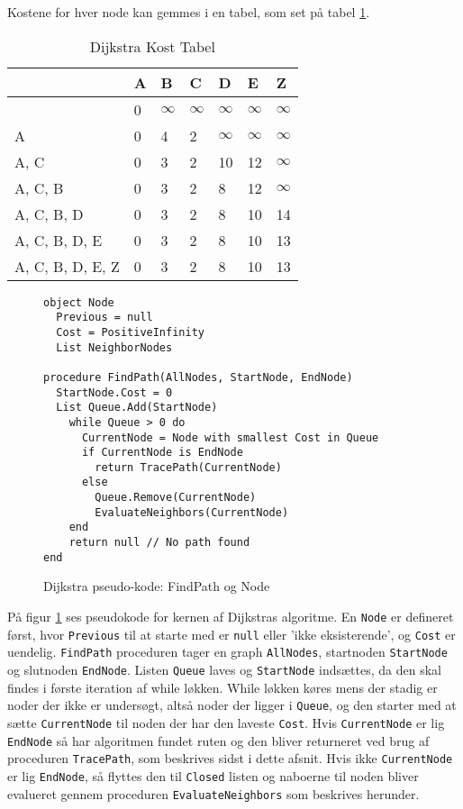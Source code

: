 Kostene for hver node kan gemmes i en tabel, som set på tabel \ref{dijktabel}.
  
\begin{table}[H]
\centering
  \begin{tabular}{|l|l|l|l|l|l|l|}
  \hline
                   & A & B & C & D  & E  & Z  \\ \hline
                   & 0 & $\infty$ & $\infty$ & $\infty$  & $\infty$  & $\infty$  \\ \hline
  A                & 0 & 4 & 2 & $\infty$  & $\infty$  & $\infty$  \\ \hline
  A, C             & 0 & 3 & 2 & 10 & 12 & $\infty$  \\ \hline
  A, C, B          & 0 & 3 & 2 & 8  & 12 & $\infty$  \\ \hline
  A, C, B, D       & 0 & 3 & 2 & 8  & 10 & 14 \\ \hline
  A, C, B, D, E    & 0 & 3 & 2 & 8  & 10 & 13 \\ \hline
  A, C, B, D, E, Z & 0 & 3 & 2 & 8  & 10 & 13 \\ \hline
  \end{tabular}
  \label{dijktabel}
  \caption{Dijkstra Kost Tabel}
\end{table}

\begin{figure}[H]
\begin{lstlisting}
object Node
  Previous = null
  Cost = PositiveInfinity
  List NeighborNodes

procedure FindPath(AllNodes, StartNode, EndNode)
  StartNode.Cost = 0
  List Queue.Add(StartNode)
    while Queue > 0 do
      CurrentNode = Node with smallest Cost in Queue
      if CurrentNode is EndNode
        return TracePath(CurrentNode)
      else
        Queue.Remove(CurrentNode)
        EvaluateNeighbors(CurrentNode)
    end
    return null // No path found
end
\end{lstlisting}
\caption{Dijkstra pseudo-kode: FindPath og Node}\label{DijkstraCodeFindPathNode}
\end{figure}

På figur \ref{DijkstraCodeFindPathNode} ses pseudokode for kernen af Dijkstras algoritme. En \texttt{Node} er defineret først, hvor \texttt{Previous} til at starte med er \texttt{null} eller 'ikke eksisterende', og \texttt{Cost} er uendelig. \texttt{FindPath} proceduren tager en graph \texttt{AllNodes}, startnoden \texttt{StartNode} og slutnoden \texttt{EndNode}. Listen \texttt{Queue} laves og \texttt{StartNode} indsættes, da den skal findes i første iteration af while løkken. While løkken køres mens der stadig er noder der ikke er undersøgt, altså noder der ligger i \texttt{Queue}, og den starter med at sætte \texttt{CurrentNode} til noden der har den laveste \texttt{Cost}. Hvis \texttt{CurrentNode} er lig \texttt{EndNode} så har algoritmen fundet ruten og den bliver returneret ved brug af proceduren \texttt{TracePath}, som beskrives sidst i dette afsnit. Hvis ikke \texttt{CurrentNode} er lig \texttt{EndNode}, så flyttes den til \texttt{Closed} listen og naboerne til noden bliver evalueret gennem proceduren \texttt{EvaluateNeighbors} som beskrives herunder.

